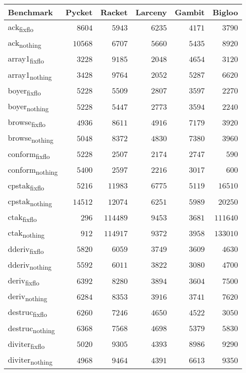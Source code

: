 %

\setlongtables

{\small


\begin{longtable}{l@{}r@{}r@{}r@{}r@{}r}
\toprule
\multicolumn{1}{l}{Benchmark}&\multicolumn{1}{c}{Pycket}&\multicolumn{1}{c}{Racket}&\multicolumn{1}{c}{Larceny}&\multicolumn{1}{c}{Gambit}&\multicolumn{1}{c}{Bigloo}\tabularnewline
\midrule
\endhead
\midrule
\endfoot
ack\textsubscript{fixflo}&$ 8604$&$   5943$&$  6235$&$ 4171$&$  3790$\tabularnewline
ack\textsubscript{nothing}&$10568$&$   6707$&$  5660$&$ 5435$&$  8920$\tabularnewline
array1\textsubscript{fixflo}&$ 3228$&$   9185$&$  2048$&$ 4654$&$  3120$\tabularnewline
array1\textsubscript{nothing}&$ 3428$&$   9764$&$  2052$&$ 5287$&$  6620$\tabularnewline
boyer\textsubscript{fixflo}&$ 5228$&$   5509$&$  2807$&$ 3597$&$  2270$\tabularnewline
boyer\textsubscript{nothing}&$ 5228$&$   5447$&$  2773$&$ 3594$&$  2240$\tabularnewline
browse\textsubscript{fixflo}&$ 4936$&$   8611$&$  4916$&$ 7179$&$  3920$\tabularnewline
browse\textsubscript{nothing}&$ 5048$&$   8372$&$  4830$&$ 7380$&$  3960$\tabularnewline
conform\textsubscript{fixflo}&$ 5228$&$   2507$&$  2174$&$ 2747$&$   590$\tabularnewline
conform\textsubscript{nothing}&$ 5400$&$   2597$&$  2216$&$ 3017$&$   600$\tabularnewline
cpstak\textsubscript{fixflo}&$ 5216$&$  11983$&$  6775$&$ 5119$&$ 16510$\tabularnewline
cpstak\textsubscript{nothing}&$14512$&$  12074$&$  6251$&$ 5989$&$ 20250$\tabularnewline
ctak\textsubscript{fixflo}&$  296$&$ 114489$&$  9453$&$ 3681$&$111640$\tabularnewline
ctak\textsubscript{nothing}&$  912$&$ 114917$&$  9372$&$ 3958$&$133010$\tabularnewline
dderiv\textsubscript{fixflo}&$ 5820$&$   6059$&$  3749$&$ 3609$&$  4630$\tabularnewline
dderiv\textsubscript{nothing}&$ 5592$&$   6011$&$  3822$&$ 3080$&$  4700$\tabularnewline
deriv\textsubscript{fixflo}&$ 6392$&$   8280$&$  3894$&$ 3604$&$  7500$\tabularnewline
deriv\textsubscript{nothing}&$ 6284$&$   8353$&$  3916$&$ 3741$&$  7620$\tabularnewline
destruc\textsubscript{fixflo}&$ 6260$&$   7246$&$  4650$&$ 4522$&$  3050$\tabularnewline
destruc\textsubscript{nothing}&$ 6368$&$   7568$&$  4698$&$ 5379$&$  5830$\tabularnewline
diviter\textsubscript{fixflo}&$ 5020$&$   9305$&$  4393$&$ 8986$&$  9290$\tabularnewline
diviter\textsubscript{nothing}&$ 4968$&$   9464$&$  4391$&$ 6613$&$  9350$\tabularnewline

\end{longtable}}
